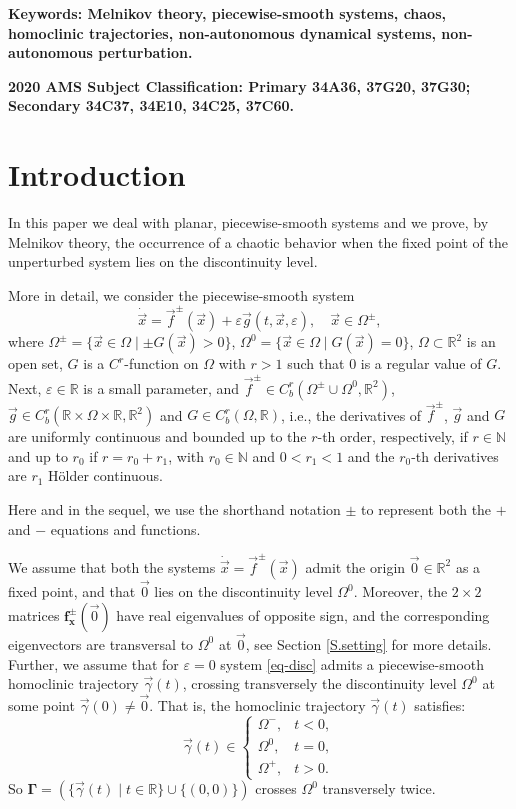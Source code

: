 \documentclass[10pt]{article}
\numberwithin{equation}{section}
\def\ga{\vec{\gamma}}
\def\ep{\varepsilon}
\def\Om{\Omega}
\def\N{{\mathbb N}}
\def\R{{\mathbb R}}
\def\x{\vec{x}}
\def\f{\vec{f}}
\def\g{\vec{g}}
\newcommand\bs[1]{{\boldsymbol{#1}}}
\theoremstyle{definition}
\theoremstyle{remark}
\begin{document}
{\bf Keywords: Melnikov theory, piecewise-smooth systems, chaos, \\ homoclinic trajectories, non-autonomous dynamical systems,
non-autonomous perturbation.}

{\bf 2020 AMS Subject Classification: Primary 34A36, 37G20, 37G30; Secondary 34C37, 34E10, 34C25, 37C60.}

\vskip 24bp






 \section{Introduction}
In this paper we deal with planar, piecewise-smooth systems and we prove, by Melnikov theory, the
occurrence of a chaotic behavior when the fixed point of the unperturbed system lies on the discontinuity level.


More in detail, we consider the piecewise-smooth system
\begin{equation}\label{eq-disc}\tag{PS}
	\dot{\x}=\f^\pm(\x)+\ep\g(t,\x,\ep),\quad \x\in\Om^\pm ,
\end{equation}
where $\Om^{\pm} = \{ \x\in\Om \mid \pm
G(\x)>0\}$, $\Om^{0}= \{ \x\in\Om \mid G(\x) = 0 \}$, $\Omega \subset \R^2$ is an open set, $G$ is a $C^{r}$-function on $\Om$ with $r> 1$
such that $0$ is a regular value of
$G$. Next, $\ep\in\R$ is a small parameter, and $\f^\pm \in C^{r}_b(\Om^\pm \cup \Omega^0, \R^2)$, $\g\in C_b^r(\R\times\Om\times\R,\R^2)$ and
$G\in C_b^r(\Om,\R)$, i.e., the
derivatives of $\f^\pm$, $\g$ and $G$ are uniformly continuous and bounded up to the $r$-th order, respectively,
 if $r\in \N$ and up to $r_0$ if $r=r_0+r_1$, with $r_0 \in \N$ and $0< r_1 <1$ and the $r_0$-th derivatives are $r_1$
H\"older continuous.


  Here and in the sequel, we
use the shorthand notation $\pm$
to
represent both the $+$ and $-$ equations and functions.

We assume that both the systems
$\dot{\vec{x}}=\f^{\pm}(\x)$
admit the origin $\vec{0} \in \R^2$ as a fixed point,
and that $\vec{0}$ lies
on the discontinuity level $\Omega^0$.
Moreover, the $2\times2$ matrices $\bs{f_x^\pm}(\vec{0})$ have real eigenvalues of opposite sign, and the corresponding eigenvectors are
transversal to $\Om^0$ at $\vec{0}$,
see Section \ref{S.setting} for more details.
Further, we assume that for $\ep=0$ system \eqref{eq-disc} admits a piecewise-smooth
homoclinic trajectory $\ga(t)$, crossing transversely the discontinuity level $\Omega^0$ at some point $\ga(0)\neq \vec{0}$.
That is, the homoclinic trajectory ${\ga}(t)$ satisfies:
 $$\ga(t)\in\begin{cases}\Om^-,& t<0,\\ \Om^0,&t=0,\\ \Om^+,&t>0.\end{cases}$$
So $\bs{\Gamma}= (\{\ga(t) \mid t \in \R \} \cup \{(0,0) \})$ crosses $\Om^0$ transversely twice.
\end{document}
